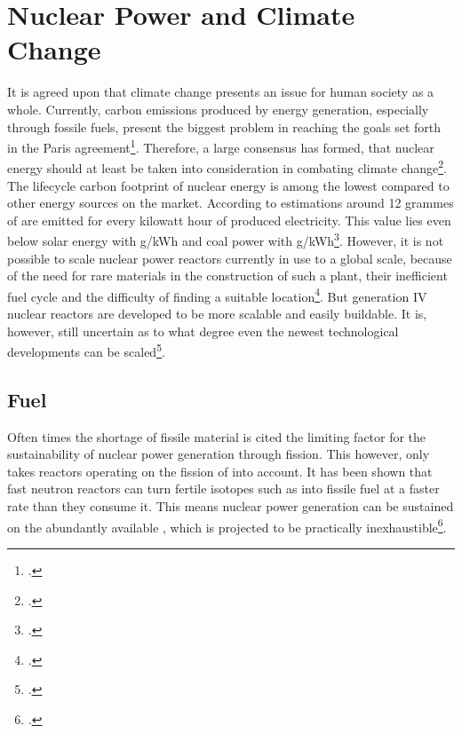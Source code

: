 \chapter{Nuclear Power and Climate Change}
It is agreed upon that climate change presents an issue for human society as a whole. Currently,
carbon emissions produced by energy generation, especially through fossile fuels,
present the biggest problem in reaching the goals set forth in the Paris agreement\footcite{paris}.
Therefore, a large consensus has formed, that nuclear energy should at least be taken into consideration
in combating climate change\footcite{nucandclim}.
The lifecycle carbon footprint of nuclear energy is among the lowest compared to other energy
sources on the market. According to estimations around 12 grammes of  are emitted for
every kilowatt hour of produced electricity. This value lies even below solar energy with \unit[40]{g/kWh}
and coal power with \unit[820]{g/kWh}\footcite{ipcc}. However, it is not possible to scale
nuclear power reactors currently in use to a global scale, because of the need for rare materials
in the construction of such a plant, their inefficient fuel cycle and the difficulty of finding a
suitable location\footcite{scale}. But generation IV nuclear reactors are developed to be more
scalable and easily buildable. It is, however, still uncertain as to what degree even the newest
technological developments can be scaled\footcite{GIFAR}.
\section{Fuel}
Often times the shortage of fissile material is cited the limiting factor for the sustainability of
nuclear power generation through fission. This however, only takes reactors operating on the fission
of  into account. It has been shown that fast neutron reactors can turn fertile isotopes
such as  into fissile fuel at a faster rate than they consume it. This means nuclear
power generation can be sustained on the abundantly available , which is projected to
be practically inexhaustible\footcite{inex}.